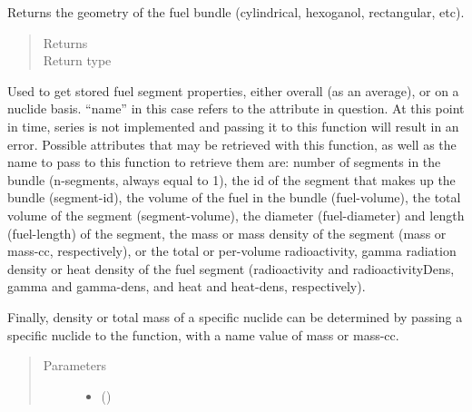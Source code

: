 \documentclass[letterpaper,10pt,openany,oneside,english]{sphinxmanual}
\begin{document}
\begin{fulllineitems}

\begin{fulllineitems}
\label{\detokenize{support_rst/fuel_segment:fuel_segment.FuelSegment.geometry}}
Returns the geometry of the fuel bundle (cylindrical, hexoganol,
rectangular, etc).
\begin{quote}\begin{description}
\item[{Returns}] \leavevmode
{}

\item[{Return type}] \leavevmode
{}

\end{description}\end{quote}

\end{fulllineitems}


\begin{fulllineitems}
\label{\detokenize{support_rst/fuel_segment:fuel_segment.FuelSegment.get_attribute}}
Used to get stored fuel segment properties, either overall (as an
average), or on a nuclide basis. “name” in this case refers to the
attribute in question. At this point in time, series is not implemented
and passing it to this function will result in an error. Possible
attributes that may be retrieved with this function, as well as the
name to pass to this function to retrieve them are: number of segments
in the bundle (n-segments, always equal to 1), the id of the segment
that makes up the bundle (segment-id), the volume of the fuel in the
bundle  (fuel-volume), the total volume of the segment
(segment-volume), the diameter (fuel-diameter) and length
(fuel-length) of the segment, the mass or mass density of the segment
(mass or mass-cc, respectively), or the total or per-volume
radioactivity, gamma radiation density or heat density of the fuel
segment (radioactivity and radioactivityDens, gamma and gamma-dens,
and heat and heat-dens, respectively).

Finally, density or total mass of a specific nuclide can be determined
by passing a specific nuclide to the function, with a name value of
mass or mass-cc.
\begin{quote}\begin{description}
\item[{Parameters}] \leavevmode\begin{itemize}
\item {} 
 () \textendash{} 


\end{itemize}
\end{description}
\end{quote}
\end{fulllineitems}
\end{fulllineitems}
\end{document}
